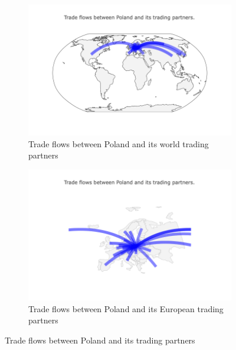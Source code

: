 \documentclass{Trade_template}
\numberwithin{equation}{section}
\begin{document}
\begin{figure}[H]
        \centering
        \begin{subfigure}[b]{0.475\textwidth}
            \centering
            \includegraphics[width=\textwidth]{Flows}
\caption[Trade flows between Poland and its world trading partners]{Trade flows between Poland and its world trading partners}
        \end{subfigure}
        \hfill
        \begin{subfigure}[b]{0.475\textwidth}  
            \centering 
            \includegraphics[width=\textwidth]{Flows_Europe}
\caption[Trade flows between Poland and its European trading partners]{Trade flows between Poland and its European trading partners}
        \end{subfigure}
\caption[Trade flows between Poland and its trading partners]{Trade flows between Poland and its trading partners}
\end{figure}
\end{document}
